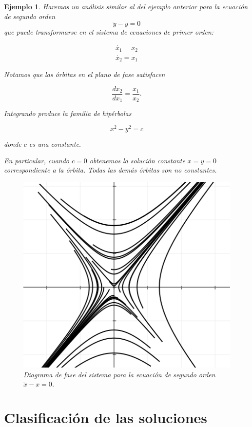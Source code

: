\documentclass[11pt]{book}
\theoremstyle{definition}
\numberwithin{definition}{section}
\theoremstyle{theorem}
\numberwithin{theorem}{section}
\numberwithin{lemma}{section}
\numberwithin{corollary}{section}
\theoremstyle{plain}
\newtheorem{example}{Ejemplo}
\numberwithin{example}{section}
\begin{document}
\begin{example}
Haremos un análisis similar al del ejemplo anterior para la ecuación de segundo orden $$ \ddot{y} - y = 0$$ que puede transformarse en el sistema de ecuaciones de primer orden:

$$
\begin{array}{l}
	\dot{x_1} = x_2 \\
	\dot{x_2} = x_1
\end{array}
$$

Notamos que las órbitas en el plano de fase satisfacen

$$ \dfrac{dx_2}{dx_1} = \frac{x_1}{x_2}. $$

Integrando produce la familia de hipérbolas

$$ x^2 - y^2 = c $$

donde $c$ es una constante.

En particular, cuando $c = 0$ obtenemos la solución constante $x = y = 0$ correspondiente a la órbita. Todas las demás órbitas son no constantes.

\begin{figure}[!ht] \centering
	\includegraphics[scale=0.5]{figures/linearsystem-hyperbolas.png}
	\caption{Diagrama de fase del sistema para la ecuación de segundo orden $\ddot{x} - x = 0$.}
\end{figure}

\end{example}

\section{Clasificación de las soluciones}
\end{document}
